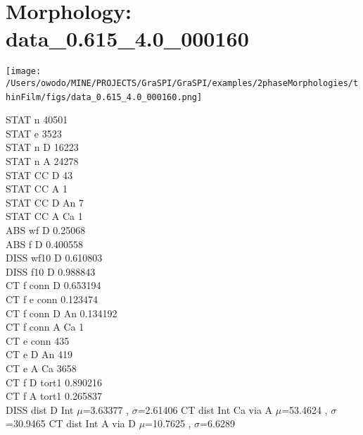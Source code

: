 \documentclass{article}
\begin{document}
\section{Morphology: data\_0.615\_4.0\_000160 }
\parbox{0.35\textwidth}{
\texttt{[image: /Users/owodo/MINE/PROJECTS/GraSPI/GraSPI/examples/2phaseMorphologies/thinFilm/figs/data\_0.615\_4.0\_000160.png]} \  
 ~\newline ~\newline 
\begin{small}
STAT n 40501\\
STAT e 3523\\
STAT n D 16223\\
STAT n A 24278\\
STAT CC D 43\\
STAT CC A 1\\
STAT CC D An 7\\
STAT CC A Ca 1\\
ABS wf D 0.25068\\
ABS f D 0.400558\\
DISS wf10 D 0.610803\\
DISS f10 D 0.988843\\
CT f conn D 0.653194\\
CT f e conn 0.123474\\
CT f conn D An 0.134192\\
CT f conn A Ca 1\\
CT e conn 435\\
CT e D An 419\\
CT e A Ca 3658\\
CT f D tort1 0.890216\\
CT f A tort1 0.265837\\

DISS dist D Int $\mu$=3.63377 , $\sigma$=2.61406 \newline
CT dist Int Ca via A $\mu$=53.4624 , $\sigma$=30.9465 \newline
CT dist Int A via D $\mu$=10.7625 , $\sigma$=6.6289 \newline
\end{small}
}
\end{document}
